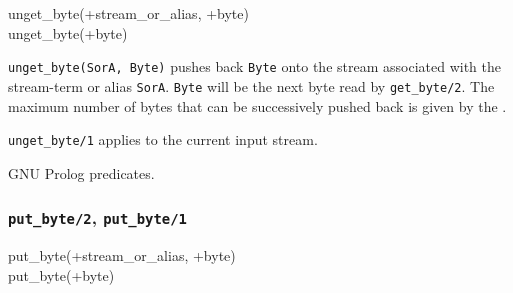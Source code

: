 \begin{TemplatesOneCol}
unget\_byte(+stream\_or\_alias, +byte)\\
unget\_byte(+byte)

\end{TemplatesOneCol}

\Description

\texttt{unget\_byte(SorA, Byte)} pushes back \texttt{Byte} onto the stream
associated with the stream-term or alias \texttt{SorA}. \texttt{Byte} will be
the next byte read by \texttt{get\_byte/2}. The maximum number of bytes that
can be successively pushed back is given by the 
 .

\texttt{unget\_byte/1} applies to the current input stream.

\begin{PlErrors}








\end{PlErrors}

\Portability

GNU Prolog predicates.

\subsubsection{\texttt{put\_byte/2},
               \texttt{put\_byte/1}}

\begin{TemplatesOneCol}
put\_byte(+stream\_or\_alias, +byte)\\
put\_byte(+byte)

\end{TemplatesOneCol}

